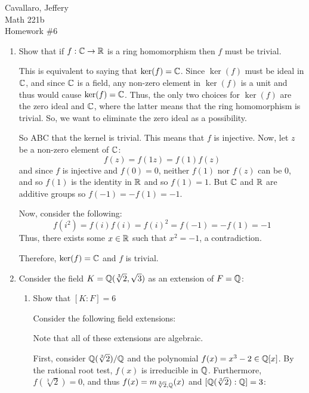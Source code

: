 \documentclass[letterpaper,12pt,fleqn]{article}
\begin{document}
Cavallaro, Jeffery \\
Math 221b \\
Homework \#6

\begin{enumerate}
\item Show that if $f:\mathbb{C}\to\mathbb{R}$ is a ring homomorphism then $f$ must be
  trivial.

  This is equivalent to saying that $\ker(f)=\mathbb{C}$. Since $\ker(f)$ must be ideal
  in $\mathbb{C}$, and since $\mathbb{C}$ is a field, any non-zero element in $\ker(f)$ is a
  unit and thus would cause $\ker(f)=\mathbb{C}$. Thus, the only two choices for
  $\ker(f)$ are the zero ideal and $\mathbb{C}$, where the latter means that the
  ring homomorphism is trivial. So, we want to eliminate the zero ideal as a
  possibility.

  So ABC that the kernel is trivial. This means that $f$ is injective. Now,
  let $z$ be a non-zero element of $\mathbb{C}$:
  \[f(z)=f(1z)=f(1)f(z)\]
  and since $f$ is injective and $f(0)=0$, neither $f(1)$ nor $f(z)$ can be
  0, and so $f(1)$ is the identity in $\mathbb{R}$ and so $f(1)=1$. But $\mathbb{C}$ and $\mathbb{R}$
  are additive groups so $f(-1)=-f(1)=-1$.

  Now, consider the following:
  \[f(i^2)=f(i)f(i)=f(i)^2=f(-1)=-f(1)=-1\]
  Thus, there exists some $x\in\mathbb{R}$ such that $x^2=-1$, a contradiction.

  Therefore, $\ker(f)=\mathbb{C}$ and $f$ is trivial.

  \bigskip

  \newcommand{\st}{\sqrt{3}}
  \newcommand{\ct}{\sqrt[3]{2}}
  \newcommand{\cf}{\sqrt[3]{4}}
  \newcommand{\fk}{\Q(\ct,\st)}
  \newcommand{\fl}{\Q(\ct)}
  \newcommand{\flt}{\Q(\st)}

\item Consider the field $K=\fk$ as an extension of $F=\mathbb{Q}$:
  \begin{enumerate}
  \item Show that $[K:F]=6$

    Consider the following field extensions:


    Note that all of these extensions are algebraic.

    First, consider $\fl/\Q$ and the polynomial $f(x)=x^3-2\in\mathbb{Q}[x]$. By the rational
    root test, $f(x)$ is irreducible in $\mathbb{Q}$. Furthermore, $f(\ct)=0$, and thus
    $f(x)=m_{\ct,\Q}(x)$ and $[\fl:\Q]=3$:


\end{enumerate}
\end{enumerate}
\end{document}
